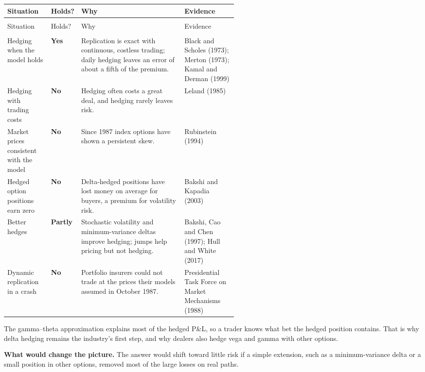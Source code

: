 {\small
\begin{longtable}{@{}>{\raggedright\arraybackslash}p{0.19\linewidth}>{\raggedright\arraybackslash}p{0.13\linewidth}>{\raggedright\arraybackslash}p{}>{\raggedright\arraybackslash}p{0.23\linewidth}@{}}
\toprule
Situation & Holds? & Why & Evidence \\
\midrule
\endfirsthead
\multicolumn{4}{@{}l}{\emph{(continued)}} \\
\toprule
Situation & Holds? & Why & Evidence \\
\midrule
\endhead
\midrule
\multicolumn{4}{r@{}}{\emph{(continued on the next page)}} \\
\endfoot
\bottomrule
\endlastfoot
Hedging when the model holds & \textbf{Yes} & Replication is exact with continuous, costless trading; daily hedging leaves an error of about a fifth of the premium. & Black and Scholes (1973); Merton (1973); Kamal and Derman (1999) \\*
\addlinespace[3pt]
Hedging with trading costs & \textbf{No} & Hedging often costs a great deal, and hedging rarely leaves risk. & Leland (1985) \\
\addlinespace[3pt]
Market prices consistent with the model & \textbf{No} & Since 1987 index options have shown a persistent skew. & Rubinstein (1994) \\
\addlinespace[3pt]
Hedged option positions earn zero & \textbf{No} & Delta-hedged positions have lost money on average for buyers, a premium for volatility risk. & Bakshi and Kapadia (2003) \\
\addlinespace[3pt]
Better hedges & \textbf{Partly} & Stochastic volatility and minimum-variance deltas improve hedging; jumps help pricing but not hedging. & Bakshi, Cao and Chen (1997); Hull and White (2017) \\*
\addlinespace[3pt]
Dynamic replication in a crash & \textbf{No} & Portfolio insurers could not trade at the prices their models assumed in October 1987. & Presidential Task Force on Market Mechanisms (1988) \\
\end{longtable}
\addtocounter{table}{-1}%
}

The gamma--theta approximation explains most of the hedged P\&L, so a trader knows what bet the hedged position contains. That is why delta hedging remains the industry's first step, and why dealers also hedge vega and gamma with other options.

\textbf{What would change the picture.} The answer would shift toward little risk if a simple extension, such as a minimum-variance delta or a small position in other options, removed most of the large losses on real paths.

